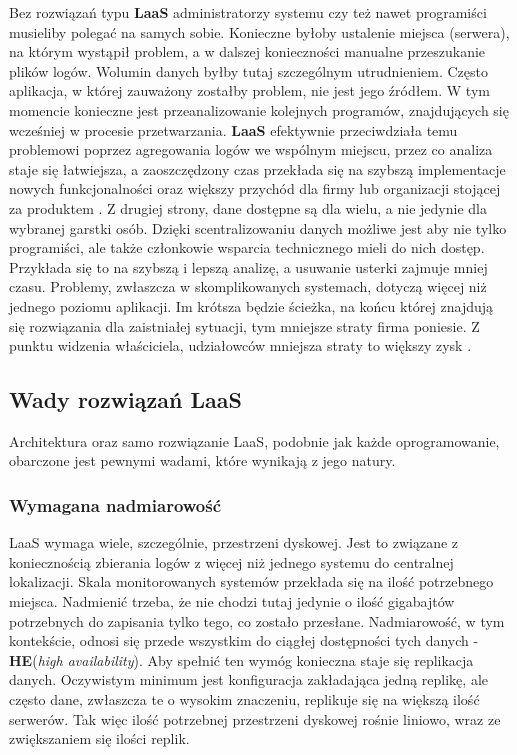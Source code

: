     Bez rozwiązań typu \textbf{LaaS} administratorzy systemu czy też nawet programiści musieliby polegać
    na samych sobie. Konieczne byłoby ustalenie miejsca (serwera), na którym wystąpił problem, a w dalszej
    konieczności manualne przeszukanie plików logów. Wolumin danych byłby tutaj szczególnym utrudnieniem.
    Często aplikacja, w której zauważony zostałby problem, nie jest jego źródłem. W tym momencie konieczne
    jest przeanalizowanie kolejnych programów, znajdujących się wcześniej w procesie przetwarzania.
    \textbf{LaaS} efektywnie przeciwdziała temu problemowi poprzez agregowania logów we wspólnym miejscu,
    przez co analiza staje się łatwiejsza, a zaoszczędzony czas przekłada się na 
    szybszą implementacje nowych funkcjonalności oraz większy przychód dla firmy
    lub organizacji stojącej za produktem \cite{log_management_explained}. Z drugiej strony, dane dostępne
    są dla wielu, a nie jedynie dla wybranej garstki osób. Dzięki scentralizowaniu danych możliwe jest
    aby nie tylko programiści, ale także członkowie wsparcia technicznego mieli do nich dostęp.
    Przykłada się to na szybszą i lepszą analizę, a usuwanie usterki zajmuje mniej czasu. Problemy, zwłaszcza
    w skomplikowanych systemach, dotyczą więcej niż jednego poziomu aplikacji. Im krótsza będzie ścieżka,
    na końcu której znajdują się rozwiązania dla zaistniałej sytuacji, tym mniejsze straty firma poniesie.
    Z punktu widzenia właściciela, udziałowców mniejsza straty to większy zysk \cite{log_management_to_build_or_to_buy}.
    
    \subsection{Wady rozwiązań LaaS}
    Architektura oraz samo rozwiązanie LaaS, podobnie jak każde oprogramowanie, obarczone jest pewnymi
    wadami, które wynikają z jego natury. 
    
    \subsubsection{Wymagana nadmiarowość}
    \label{chapter:monitoring_architecture:laas:issue:data_size}
    LaaS wymaga wiele, szczególnie, przestrzeni dyskowej. Jest to związane z koniecznością zbierania logów z więcej niż jednego
    systemu do centralnej lokalizacji. Skala monitorowanych systemów przekłada się na ilość potrzebnego miejsca. Nadmienić trzeba, 
    że nie chodzi tutaj jedynie o ilość gigabajtów potrzebnych do zapisania tylko tego, co zostało przesłane. Nadmiarowość, w tym kontekście,
    odnosi się przede wszystkim do ciągłej dostępności tych danych - \textbf{HE}(\textit{high availability}). Aby spełnić ten wymóg
    konieczna staje się replikacja danych. Oczywistym minimum jest konfiguracja zakładająca jedną replikę, ale często dane, zwłaszcza te
    o wysokim znaczeniu, replikuje się na większą ilość serwerów. Tak więc ilość potrzebnej przestrzeni dyskowej
    rośnie liniowo, wraz ze zwiększaniem się ilości replik.
    
